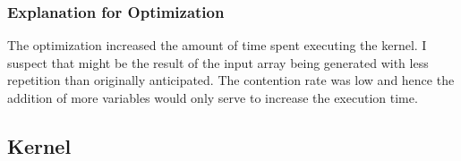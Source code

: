 \documentclass{article}
\begin{document}
\subsubsection{Explanation for Optimization}
The optimization increased the amount of time spent executing the kernel. I suspect that might be the result of the input array being generated with less repetition than originally anticipated. The contention rate was low and hence the addition of more variables would only serve to increase the execution time. 
\subsection{Kernel}
\inputminted[breaklines, linenos]{c}{./kernel.cu}
\end{document}
